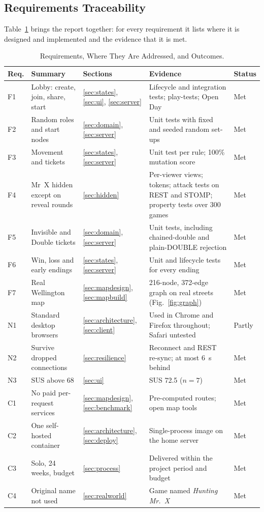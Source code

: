 \documentclass[lettersize,journal]{IEEEtran}
\begin{document}
\subsection{Requirements Traceability}\label{sec:trace}
Table~\ref{tab:trace} brings the report together: for every requirement it lists where it is designed and implemented and the evidence that it is met.

\begin{table}[!t]
\caption{Requirements, Where They Are Addressed, and Outcomes.}
\label{tab:trace}
\centering
\small
\begin{tabular}{@{}lp{}p{}p{}l@{}}
\toprule
Req. & Summary & Sections & Evidence & Status \\
\midrule
F1 & Lobby: create, join, share, start & \ref{sec:states}, \ref{sec:ui}, \ref{sec:server} & Lifecycle and integration tests; play-tests; Open Day & Met \\
F2 & Random roles and start nodes & \ref{sec:domain}, \ref{sec:server} & Unit tests with fixed and seeded random set-ups & Met \\
F3 & Movement and tickets & \ref{sec:states}, \ref{sec:server} & Unit test per rule; 100\% mutation score & Met \\
F4 & Mr~X hidden except on reveal rounds & \ref{sec:hidden} & Per-viewer views; tokens; attack tests on REST and STOMP; property tests over 300 games & Met \\
F5 & Invisible and Double tickets & \ref{sec:domain}, \ref{sec:server} & Unit tests, including chained-double and plain-DOUBLE rejection & Met \\
F6 & Win, loss and early endings & \ref{sec:states}, \ref{sec:server} & Unit and lifecycle tests for every ending & Met \\
F7 & Real Wellington map & \ref{sec:mapdesign}, \ref{sec:mapbuild} & 216-node, 372-edge graph on real streets (Fig.~\ref{fig:graph}) & Met \\
N1 & Standard desktop browsers & \ref{sec:architecture}, \ref{sec:client} & Used in Chrome and Firefox throughout; Safari untested & Partly \\
N2 & Survive dropped connections & \ref{sec:resilience} & Reconnect and REST re-sync; at most 6~s behind & Met \\
N3 & SUS above 68 & \ref{sec:ui} & SUS 72.5 ($n=7$) & Met \\
C1 & No paid per-request services & \ref{sec:mapdesign}, \ref{sec:benchmark} & Pre-computed routes; open map tools & Met \\
C2 & One self-hosted container & \ref{sec:architecture}, \ref{sec:deploy} & Single-process image on the home server & Met \\
C3 & Solo, 24 weeks, budget & \ref{sec:process} & Delivered within the project period and budget & Met \\
C4 & Original name not used & \ref{sec:realworld} & Game named \emph{Hunting Mr.~X} & Met \\
\bottomrule
\end{tabular}
\end{table}
\end{document}
